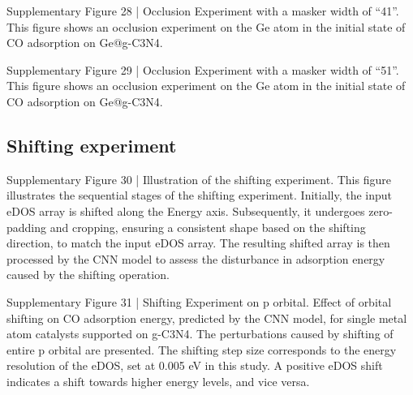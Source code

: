 Supplementary Figure 28 | Occlusion Experiment with a masker width of “41”. This figure shows an occlusion experiment on the Ge atom in the initial state of CO adsorption on Ge@g-C3N4.

Supplementary Figure 29 | Occlusion Experiment with a masker width of “51”. This figure shows an occlusion experiment on the Ge atom in the initial state of CO adsorption on Ge@g-C3N4.


\subsection{Shifting experiment}

Supplementary Figure 30 | Illustration of the shifting experiment. This figure illustrates the sequential stages of the shifting experiment. Initially, the input eDOS array is shifted along the Energy axis. Subsequently, it undergoes zero-padding and cropping, ensuring a consistent shape based on the shifting direction, to match the input eDOS array. The resulting shifted array is then processed by the CNN model to assess the disturbance in adsorption energy caused by the shifting operation.


Supplementary Figure 31 | Shifting Experiment on p orbital. Effect of orbital shifting on CO adsorption energy, predicted by the CNN model, for single metal atom catalysts supported on g-C3N4. The perturbations caused by shifting of entire p orbital are presented. The shifting step size corresponds to the energy resolution of the eDOS, set at 0.005 eV in this study. A positive eDOS shift indicates a shift towards higher energy levels, and vice versa.

